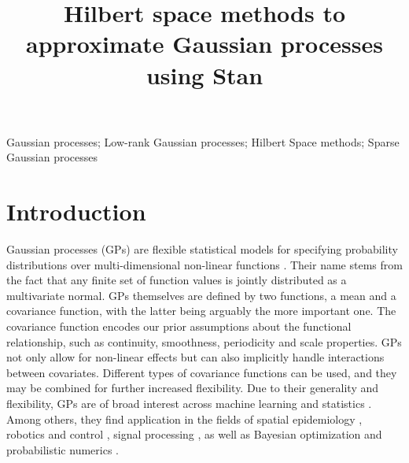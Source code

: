 \documentclass[]{interact}
\theoremstyle{plain}%
\theoremstyle{definition}
\theoremstyle{remark}
\begin{document}

\title{Hilbert space methods to approximate Gaussian processes using Stan}


\maketitle

\begin{abstract}

\end{abstract}

\begin{keywords}
Gaussian processes; Low-rank Gaussian processes; Hilbert Space methods; Sparse Gaussian processes
\end{keywords}

\tableofcontents


\newpage

\section{Introduction}\label{sec:bf_intro}

Gaussian processes (GPs) are flexible statistical models for specifying probability distributions over multi-dimensional non-linear functions \citep{rasmussen2006gaussian,neal1997monte}. Their name stems from the fact that any finite set of function values is jointly distributed as a multivariate normal. GPs themselves are defined by two functions, a mean and a covariance function, with the latter being arguably the more important one. The covariance function encodes our prior assumptions about the functional relationship, such as continuity, smoothness, periodicity and scale properties. GPs not only allow for non-linear effects but can also implicitly handle interactions between covariates. Different types of covariance functions can be used, and they may be combined for further increased flexibility. Due to their generality and flexibility, GPs are of broad interest across machine learning and statistics \citep{rasmussen2006gaussian,neal1997monte}. Among others, they find application in the fields of spatial epidemiology \citep{diggle2013statistical,carlin2014hierarchical}, robotics and control \citep{deisenroth2015gaussian}, signal processing \citep{sarkka2013spatiotemporal}, as well as Bayesian optimization and probabilistic numerics \citep{roberts2010bayesian,briol2015probabilistic,hennig2015probabilistic}.
\end{document}
